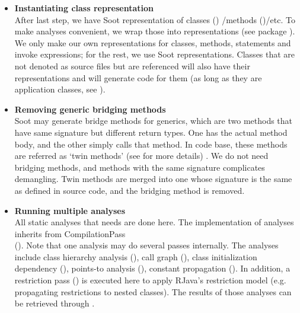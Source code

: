 \documentclass[12pt]{article}
\begin{document}
\begin{enumerate}
\begin{enumerate}
\begin{itemize}
    \item
    \textbf{Instantiating \rjc class representation\\}
    After last step, we have Soot representation of 
    classes ()
    /methods ()/etc. 
    To make analyses convenient, we wrap those into \rjc 
    representations (see package 
    ). 
	We only make our own representations for classes, 
	methods, 	statements and invoke expressions; for the rest,
	we use Soot representations. 
    Classes that are not denoted as source files but are 
    referenced will also have their \rjc representations
    and \rjc will generate code for them (as long as they are
    application classes, see ).

    \item
    \textbf{Removing generic bridging methods\\}
    Soot may generate bridge methods for generics, which are
    two methods that have same signature but different
    return types. One has the actual method body, and the
    other simply calls that method. 
    In \rjc code base, these methods are referred as 
    `twin methods' 
    (see  for more details)
    . We do not need bridging methods, and 
    methods with the same signature complicates demangling. 
    Twin methods are merged into one whose
    signature is the same as defined in source code, and
    the bridging method is removed. 
    
    \item
    \textbf{Running multiple analyses\\}
    All static analyses that \rjc needs are done here. 
    The implementation of analyses inherits from
    CompilationPass\\ ().
    Note that one analysis may do several passes internally. 
    The analyses include 
    class hierarchy analysis (),
    call graph (), 
    class initialization dependency (),
    points-to analysis (),
    constant propagation (). 
    In addition, a restriction pass ()
    is executed here to apply
    RJava's restriction model (e.g. propagating restrictions
    to nested classes). The results of those analyses 
    can be retrieved through . 
    

\end{itemize}
\end{enumerate}
\end{enumerate}
\end{document}
